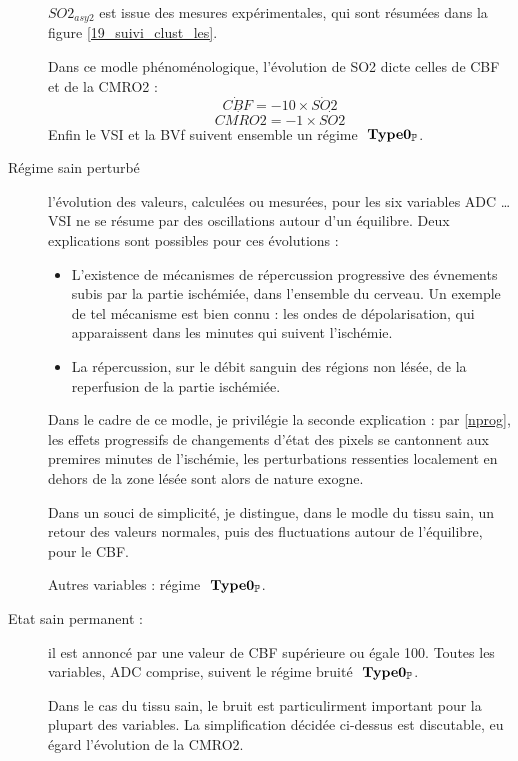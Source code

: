 \begin{description}
$SO2_{asy2}$ est issue des mesures exp\'erimentales, qui sont r\'esum\'ees dans la figure \ref{19_suivi_clust_les}.
\par
Dans ce modle ph\'enom\'enologique, l'\'evolution de SO2 dicte celles de CBF et de la CMRO2 :
\begin{equation}
\dot{CBF}=-10\times\dot{SO2}
\end{equation}
\begin{equation}
\dot{CMRO2}=-1\times\dot{SO2}
\end{equation}
Enfin le VSI et la BVf suivent ensemble un r\'egime $\ \mathbf{Type 0_{\mathbb{P}}}$.
%
\item[R\'egime sain perturb\'e] l'\'evolution des valeurs, calcul\'ees ou mesur\'ees, pour les six variables ADC \dots VSI %
ne se r\'esume par  des oscillations autour d'un \'equilibre. Deux explications sont possibles pour ces \'evolutions :
\begin{itemize}
\item L'existence de m\'ecanismes de r\'epercussion progressive des \'evnements subis par la partie isch\'emi\'ee, %
dans l'ensemble du cerveau. Un exemple de tel m\'ecanisme est bien connu : les ondes de d\'epolarisation, qui apparaissent dans les minutes qui suivent l'isch\'emie.
%
\item La r\'epercussion, sur le d\'ebit sanguin des r\'egions non l\'es\'ee, de la reperfusion de la partie isch\'emi\'ee.
\end{itemize}

\par
Dans le cadre de ce modle, je privil\'egie la seconde explication : par \ref{nprog}, %
les effets progressifs de changements d'\'etat des pixels se cantonnent aux premires minutes de l'isch\'emie, %
les perturbations ressenties localement en dehors de la zone l\'es\'ee sont alors de nature exogne.

\par
Dans un souci de simplicit\'e, je distingue, dans le modle du tissu sain, %
un retour  des valeurs normales, puis des fluctuations autour de l'\'equilibre, pour le CBF.


Autres variables : r\'egime $\ \mathbf{Type 0_{\mathbb{P}}}$.
\item[Etat sain permanent : ] il est annonc\'e par une valeur de CBF sup\'erieure ou \'egale  100. %
Toutes les variables, ADC comprise, suivent le r\'egime bruit\'e $\ \mathbf{Type 0_{\mathbb{P}}}$.

\par
Dans le cas du tissu sain, le bruit est particulirment important pour la plupart des variables. %
La simplification d\'ecid\'ee ci-dessus est discutable, eu \'egard l'\'evolution de la CMRO2.
\end{description}

